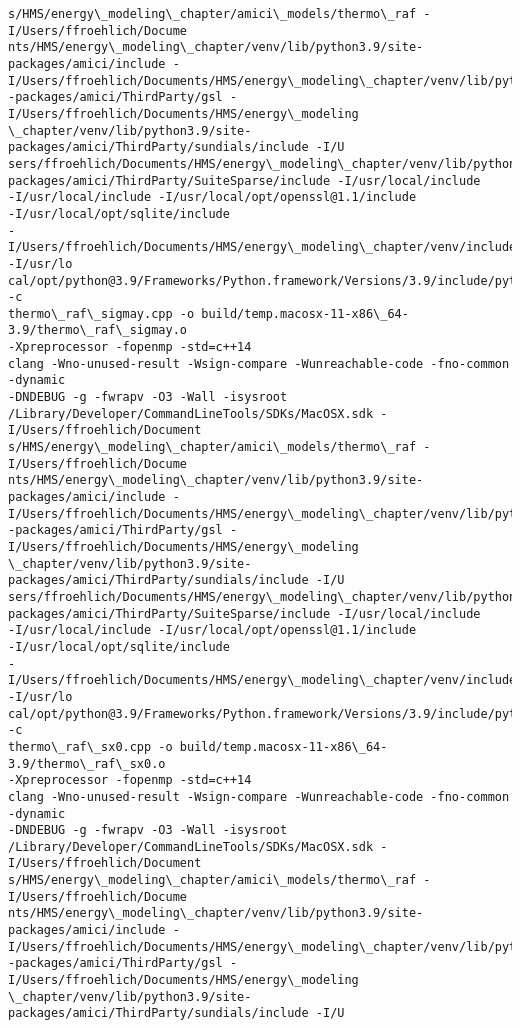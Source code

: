 \documentclass[11pt]{article}
\begin{document}
\begin{Verbatim}[commandchars=\\\{\}]
s/HMS/energy\_modeling\_chapter/amici\_models/thermo\_raf -I/Users/ffroehlich/Docume
nts/HMS/energy\_modeling\_chapter/venv/lib/python3.9/site-packages/amici/include -
I/Users/ffroehlich/Documents/HMS/energy\_modeling\_chapter/venv/lib/python3.9/site
-packages/amici/ThirdParty/gsl -I/Users/ffroehlich/Documents/HMS/energy\_modeling
\_chapter/venv/lib/python3.9/site-packages/amici/ThirdParty/sundials/include -I/U
sers/ffroehlich/Documents/HMS/energy\_modeling\_chapter/venv/lib/python3.9/site-
packages/amici/ThirdParty/SuiteSparse/include -I/usr/local/include
-I/usr/local/include -I/usr/local/opt/openssl@1.1/include
-I/usr/local/opt/sqlite/include
-I/Users/ffroehlich/Documents/HMS/energy\_modeling\_chapter/venv/include -I/usr/lo
cal/opt/python@3.9/Frameworks/Python.framework/Versions/3.9/include/python3.9 -c
thermo\_raf\_sigmay.cpp -o build/temp.macosx-11-x86\_64-3.9/thermo\_raf\_sigmay.o
-Xpreprocessor -fopenmp -std=c++14
clang -Wno-unused-result -Wsign-compare -Wunreachable-code -fno-common -dynamic
-DNDEBUG -g -fwrapv -O3 -Wall -isysroot
/Library/Developer/CommandLineTools/SDKs/MacOSX.sdk -I/Users/ffroehlich/Document
s/HMS/energy\_modeling\_chapter/amici\_models/thermo\_raf -I/Users/ffroehlich/Docume
nts/HMS/energy\_modeling\_chapter/venv/lib/python3.9/site-packages/amici/include -
I/Users/ffroehlich/Documents/HMS/energy\_modeling\_chapter/venv/lib/python3.9/site
-packages/amici/ThirdParty/gsl -I/Users/ffroehlich/Documents/HMS/energy\_modeling
\_chapter/venv/lib/python3.9/site-packages/amici/ThirdParty/sundials/include -I/U
sers/ffroehlich/Documents/HMS/energy\_modeling\_chapter/venv/lib/python3.9/site-
packages/amici/ThirdParty/SuiteSparse/include -I/usr/local/include
-I/usr/local/include -I/usr/local/opt/openssl@1.1/include
-I/usr/local/opt/sqlite/include
-I/Users/ffroehlich/Documents/HMS/energy\_modeling\_chapter/venv/include -I/usr/lo
cal/opt/python@3.9/Frameworks/Python.framework/Versions/3.9/include/python3.9 -c
thermo\_raf\_sx0.cpp -o build/temp.macosx-11-x86\_64-3.9/thermo\_raf\_sx0.o
-Xpreprocessor -fopenmp -std=c++14
clang -Wno-unused-result -Wsign-compare -Wunreachable-code -fno-common -dynamic
-DNDEBUG -g -fwrapv -O3 -Wall -isysroot
/Library/Developer/CommandLineTools/SDKs/MacOSX.sdk -I/Users/ffroehlich/Document
s/HMS/energy\_modeling\_chapter/amici\_models/thermo\_raf -I/Users/ffroehlich/Docume
nts/HMS/energy\_modeling\_chapter/venv/lib/python3.9/site-packages/amici/include -
I/Users/ffroehlich/Documents/HMS/energy\_modeling\_chapter/venv/lib/python3.9/site
-packages/amici/ThirdParty/gsl -I/Users/ffroehlich/Documents/HMS/energy\_modeling
\_chapter/venv/lib/python3.9/site-packages/amici/ThirdParty/sundials/include -I/U

\end{Verbatim}
\end{document}
